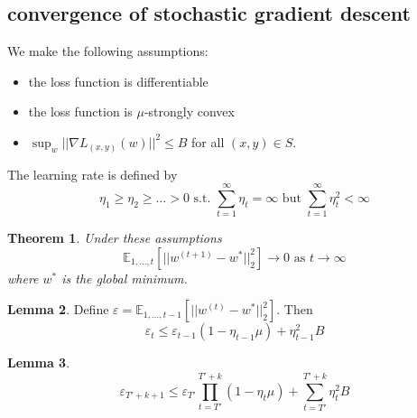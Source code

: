 \documentclass[a4paper, 12pt]{article}
\theoremstyle{plain}
\newtheorem{theorem}{Theorem}[subsection] %
\theoremstyle{definition}
\theoremstyle{lemma}
\newtheorem{lemma}[theorem]{Lemma}
\theoremstyle{remark}
\theoremstyle{example}
\begin{document}
	\subsection{convergence of stochastic gradient descent}
	We make the following assumptions: \begin{itemize}
		\item the loss function is differentiable
		\item the loss function is $\mu$-strongly convex
		\item $\sup_{w} ||\nabla L_{(x,y)}(w)||^2 \leq B$ for all $(x,y) \in S$.
	\end{itemize}
	The learning rate is defined by \[\eta_1 \geq \eta_2 \geq ... > 0 \text{ s.t. } \sum_{t=1}^\infty \eta_t = \infty \text{ but } \sum_{t=1}^\infty \eta_t^2 < \infty\]
	\begin{theorem}
		Under these assumptions \[\mathbb{E}_{1,...,t} [||w^{(t+1)} - w^*||_2^2] \to 0 \text{ as } t \to \infty\] where $w^*$ is the global minimum.
	\end{theorem}
	\begin{lemma}
		Define $\varepsilon = \mathbb{E}_{1,...,t-1} [||w^{(t)} - w^*||_2^2]$. Then \[\varepsilon_t \leq \varepsilon_{t-1}(1-\eta_{t-1}\mu) + \eta_{t-1}^2B\]
	\end{lemma}
	\begin{lemma}
		\[\varepsilon_{T'+k+1}\leq \varepsilon_{T'}\prod_{t=T'}^{T'+k}(1-\eta_t\mu) + \sum_{t=T'}^{T'+k}\eta_t^2B\]
	\end{lemma}
\end{document}

